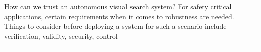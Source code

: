 How can we trust an autonomous visual search system?
For safety critical applications, certain requirements when it comes to robustness are needed.
Things to consider before deploying a system for such a scenario include verification, validity, security, control







\rule{5cm}{1pt}

